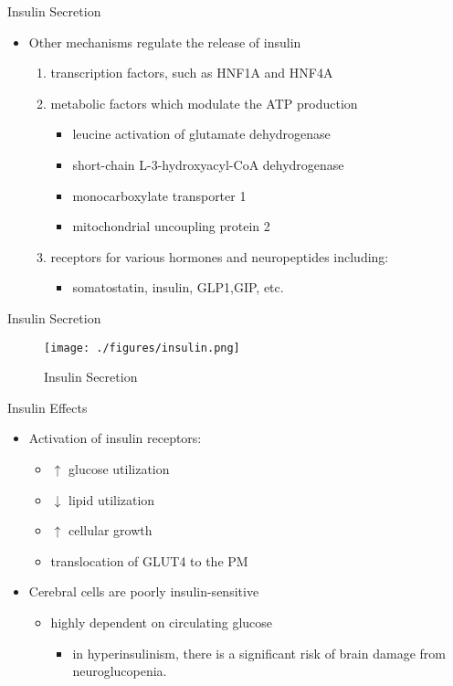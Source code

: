 \documentclass[presentation, smaller]{beamer}
\begin{document}
\begin{frame}[label={sec:org5ff7989}]{Insulin Secretion}
\begin{itemize}
\item Other mechanisms regulate the release of insulin
\begin{enumerate}
\item transcription factors, such as HNF1A and HNF4A

\item metabolic factors which modulate the ATP production
\begin{itemize}
\item leucine activation of glutamate dehydrogenase
\item short-chain L-3-hydroxyacyl-CoA dehydrogenase
\item monocarboxylate transporter 1
\item mitochondrial uncoupling protein 2
\end{itemize}
\item receptors for various hormones and neuropeptides including:
\begin{itemize}
\item somatostatin, insulin, GLP1,GIP, etc.
\end{itemize}
\end{enumerate}
\end{itemize}
\end{frame}

\begin{frame}[label={sec:org6b5b9b2}]{Insulin Secretion}
\begin{figure}[htbp]
\centering
\texttt{[image: ./figures/insulin.png]}
\caption[insulin]{\label{fig:org94e489a}
Insulin Secretion}
\end{figure}
\end{frame}

\begin{frame}[label={sec:org7fd9143}]{Insulin Effects}
\begin{itemize}
\item Activation of insulin receptors:
\begin{itemize}
\item \(\uparrow\) glucose utilization
\item \(\downarrow\) lipid utilization
\item \(\uparrow\) cellular growth
\item translocation of GLUT4 to the PM
\end{itemize}
\item Cerebral cells are poorly insulin-sensitive
\begin{itemize}
\item highly dependent on circulating glucose
\begin{itemize}
\item in hyperinsulinism, there is a significant risk of brain damage
from neuroglucopenia.
\end{itemize}
\end{itemize}
\end{itemize}
\end{frame}
\end{document}

